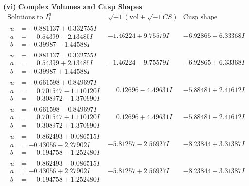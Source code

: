\documentclass[1p]{elsarticle_modified}
\theoremstyle{definition}
\newcommand{\I}{\sqrt{-1}}
\begin{document}
\newpage\flushleft \textbf{(vi) Complex Volumes and Cusp Shapes}
$$\begin{array}{c|c|c}  
\text{Solutions to }I^u_{1}& \I (\text{vol} + \sqrt{-1}CS) & \text{Cusp shape}\\
 \hline 
\begin{aligned}
u &= -0.881137 + 0.332755 I \\
a &= \phantom{-}0.54399 - 2.13485 I \\
b &= -0.39987 - 1.44588 I\end{aligned}
 & -1.46224 + 9.75579 I & -6.92865 - 6.33368 I \\ \hline\begin{aligned}
u &= -0.881137 - 0.332755 I \\
a &= \phantom{-}0.54399 + 2.13485 I \\
b &= -0.39987 + 1.44588 I\end{aligned}
 & -1.46224 - 9.75579 I & -6.92865 + 6.33368 I \\ \hline\begin{aligned}
u &= -0.661598 + 0.849697 I \\
a &= \phantom{-}0.701547 - 1.110120 I \\
b &= \phantom{-}0.308972 - 1.370990 I\end{aligned}
 & \phantom{-}0.12696 - 4.49631 I & -5.88481 + 2.41612 I \\ \hline\begin{aligned}
u &= -0.661598 - 0.849697 I \\
a &= \phantom{-}0.701547 + 1.110120 I \\
b &= \phantom{-}0.308972 + 1.370990 I\end{aligned}
 & \phantom{-}0.12696 + 4.49631 I & -5.88481 - 2.41612 I \\ \hline\begin{aligned}
u &= \phantom{-}0.862493 + 0.086515 I \\
a &= -0.43056 - 2.27902 I \\
b &= \phantom{-}0.194758 - 1.252480 I\end{aligned}
 & -5.81257 - 2.56927 I & -8.23844 + 3.31387 I \\ \hline\begin{aligned}
u &= \phantom{-}0.862493 - 0.086515 I \\
a &= -0.43056 + 2.27902 I \\
b &= \phantom{-}0.194758 + 1.252480 I\end{aligned}
 & -5.81257 + 2.56927 I & -8.23844 - 3.31387 I \\ \hline\begin{aligned}

\end{aligned}
\end{array}$$
\end{document}
